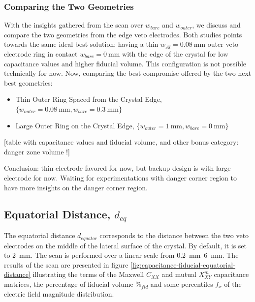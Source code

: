 \subsubsection{Comparing the Two Geometries}

With the insights gathered from the scan over $w_{bare}$ and $w_{outer}$, we discuss and compare the two geometries from the edge veto electrodes. Both studies points towards the same ideal best solution: having a thin $w_{Al} = \SI{0.08}{\mm}$ outer veto electrode ring in contact $w_{bare}=\SI{0}{\mm}$ with the edge of the crystal for low capacitance values and higher fiducial volume. This configuration is not possible technically for now. Now, comparing the best compromise offered by the two next best geometries:
\begin{itemize}
	\item Thin Outer Ring Spaced from the Crystal Edge, $\{ w_{outer} = \SI{0.08}{\mm}, w_{bare} = \SI{0.3}{\mm} \}$
	\item Large Outer Ring on the Crystal Edge, $\{ w_{outer} = \SI{1}{\mm}, w_{bare} = \SI{0}{\mm} \}$
\end{itemize}

{\color{red} [table with capacitance values and fiducial volume, and other bonus category: danger zone volume !]}

Conclusion: thin electrode favored for now, but backup design is with large electrode for now.
Waiting for experimentations with danger corner region to have more insights on the danger corner region.


\subsection{Equatorial Distance, $d_{eq}$}
\label{par:equatorial-distance}

The equatorial distance $d_{equator}$ corresponds to the distance between the two veto electrodes on the middle of the lateral surface of the crystal. By default, it is set to \SI{2}{\mm}. The scan is performed over a linear scale from \SIrange{0.2}{6}{\mm}. The results of the scan are presented in figure \ref{fig:capacitance-fiducial-equatorial-distance} illustrating the terms of the Maxwell $C_{XX}$ and mutual $X_{XY}^m$ capacitance matrices, the percentage of fiducial volume $\%_{fid}$ and some percentiles $f_x$ of the electric field magnitude distribution. 

